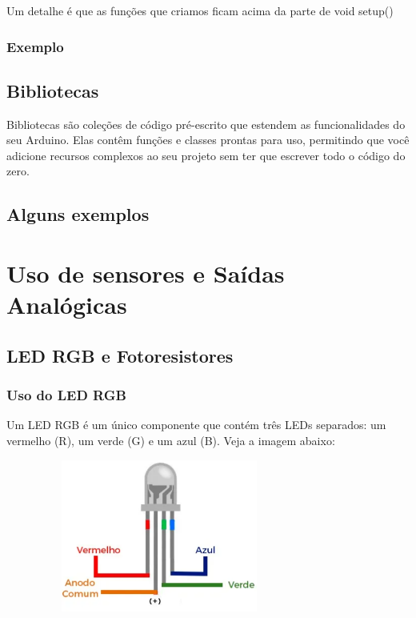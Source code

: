 \documentclass{report}
\begin{document}
	Um detalhe é que as funções que criamos ficam acima da parte de void setup()
	
	\subsubsection{Exemplo}
	\subsection{Bibliotecas}
	Bibliotecas são coleções de código pré-escrito que estendem as funcionalidades do seu Arduino. Elas contêm funções e classes prontas para uso, permitindo que você adicione recursos complexos ao seu projeto sem ter que escrever todo o código do zero.
	
	
	\subsection{Alguns exemplos}
	
	\section{Uso de sensores e Saídas Analógicas}
	\subsection{LED RGB e Fotoresistores}
	\subsubsection{Uso do LED RGB}
	Um LED RGB é um único componente que contém três LEDs separados: um vermelho (R), um verde (G) e um azul (B). Veja a imagem abaixo:
	
	\begin{figure}[ht]
		\centering
		\includegraphics[width=8cm,height=5cm,keepaspectratio=false]{imagens/led_rgb.png}
		
		
	\end{figure}
	
\end{document}
